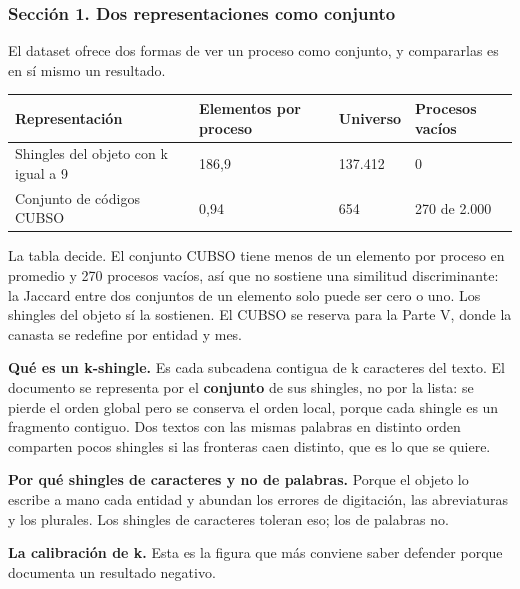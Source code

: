\documentclass[11pt]{article}
\begin{document}
\subsubsection*{Sección 1. Dos representaciones como conjunto}
El dataset ofrece dos formas de ver un proceso como conjunto, y compararlas es en sí mismo un resultado.

\begin{center}\footnotesize
\begin{tabularx}{\linewidth}{Q{1.583}Q{0.950}Q{0.733}Q{0.733}}
\toprule
\textbf{Representación} & \textbf{Elementos por proceso} & \textbf{Universo} & \textbf{Procesos vacíos} \\
\midrule
Shingles del objeto con k igual a 9 & 186,9 & 137.412 & 0 \\
Conjunto de códigos CUBSO & 0,94 & 654 & 270 de 2.000 \\
\bottomrule
\end{tabularx}
\end{center}
La tabla decide. El conjunto CUBSO tiene menos de un elemento por proceso en promedio y 270 procesos vacíos, así que no sostiene una similitud discriminante: la Jaccard entre dos conjuntos de un elemento solo puede ser cero o uno. Los shingles del objeto sí la sostienen. El CUBSO se reserva para la Parte V, donde la canasta se redefine por entidad y mes.

\textbf{Qué es un k-shingle.} Es cada subcadena contigua de k caracteres del texto. El documento se representa por el \textbf{conjunto} de sus shingles, no por la lista: se pierde el orden global pero se conserva el orden local, porque cada shingle es un fragmento contiguo. Dos textos con las mismas palabras en distinto orden comparten pocos shingles si las fronteras caen distinto, que es lo que se quiere.

\textbf{Por qué shingles de caracteres y no de palabras.} Porque el objeto lo escribe a mano cada entidad y abundan los errores de digitación, las abreviaturas y los plurales. Los shingles de caracteres toleran eso; los de palabras no.

\textbf{La calibración de k.} Esta es la figura que más conviene saber defender porque documenta un resultado negativo.
\end{document}
